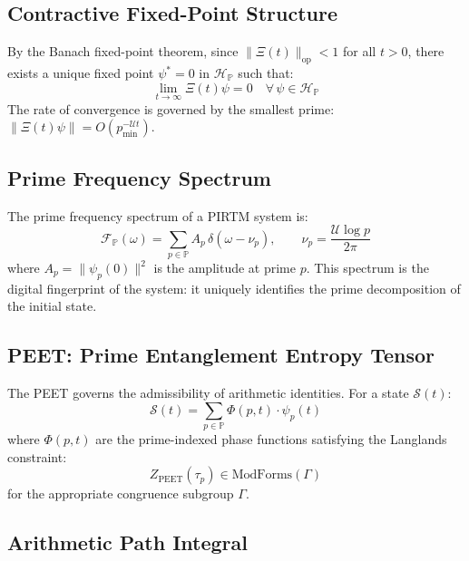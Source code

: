 \documentclass[12pt,letterpaper]{article}
\theoremstyle{definition}
\theoremstyle{remark}
\begin{document}
\subsection{Contractive Fixed-Point Structure}

By the Banach fixed-point theorem, since $\|\Xi(t)\|_{\mathrm{op}} < 1$ for all $t > 0$, there exists a unique fixed point $\psi^* = 0$ in $\mathcal{H}_\mathbb{P}$ such that:
\begin{equation}
\lim_{t \to \infty} \Xi(t)\psi = 0 \quad \forall\, \psi \in \mathcal{H}_\mathbb{P}
\end{equation}
The rate of convergence is governed by the smallest prime: $\|\Xi(t)\psi\| = O(p_{\min}^{-\mathcal{U}t})$.

\subsection{Prime Frequency Spectrum}

The prime frequency spectrum of a PIRTM system is:
\begin{equation}
\mathcal{F}_\mathbb{P}(\omega) = \sum_{p \in \mathbb{P}} A_p\,\delta(\omega - \nu_p), \qquad \nu_p = \frac{\mathcal{U}\log p}{2\pi}
\end{equation}
where $A_p = \|\psi_p(0)\|^2$ is the amplitude at prime $p$. This spectrum is the digital fingerprint of the system: it uniquely identifies the prime decomposition of the initial state.

\subsection{PEET: Prime Entanglement Entropy Tensor}

The PEET governs the admissibility of arithmetic identities. For a state $\mathcal{S}(t)$:
\begin{equation}
\mathcal{S}(t) = \sum_{p \in \mathbb{P}} \Phi(p, t)\cdot\psi_p(t)
\end{equation}
where $\Phi(p,t)$ are the prime-indexed phase functions satisfying the Langlands constraint:
\begin{equation}
Z_{\text{PEET}}(\tau_p) \in \text{ModForms}(\Gamma)
\end{equation}
for the appropriate congruence subgroup $\Gamma$.

\subsection{Arithmetic Path Integral}
\end{document}
